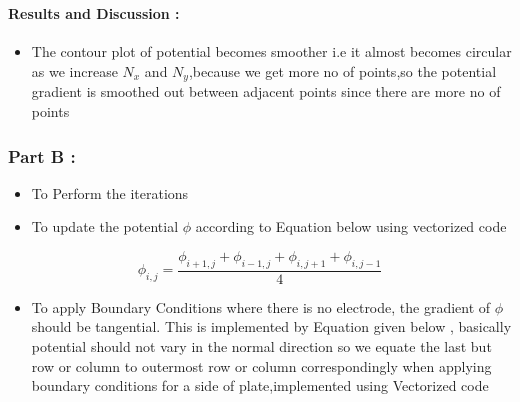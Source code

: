 \documentclass[11pt]{article}
\providecommand{\tightlist}{%
      \setlength{\itemsep}{0pt}\setlength{\parskip}{0pt}}
\begin{document}
	

	

    \begin{center}
    \end{center}
    { \hspace*{\fill} \\}
    
	
		
    \paragraph{Results and Discussion :}\label{results-and-discussion}

\begin{itemize}
\tightlist
\item
  The contour plot of potential becomes smoother i.e it almost becomes
  circular as we increase \(N_x\) and \(N_y\),because we get more no of
  points,so the potential gradient is smoothed out between adjacent
  points since there are more no of points
\end{itemize}

	

	
		
    \subsubsection{Part B :}\label{part-b}

\begin{itemize}
\tightlist
\item
  To Perform the iterations
\item
  To update the potential \(\phi\) according to Equation below using
  vectorized code
\end{itemize}

\begin{equation}
        \phi_{i,j} = \frac{\phi_{i+1,j} + \phi_{i-1,j} + \phi_{i,j+1} + \phi_{i,j-1}}{4} 
\end{equation}

\begin{itemize}
\tightlist
\item
  To apply Boundary Conditions where there is no electrode, the gradient
  of \(\phi\) should be tangential. This is implemented by Equation
  given below , basically potential should not vary in the normal
  direction so we equate the last but row or column to outermost row or
  column correspondingly when applying boundary conditions for a side of
  plate,implemented using Vectorized code
\end{itemize}
\end{document}
